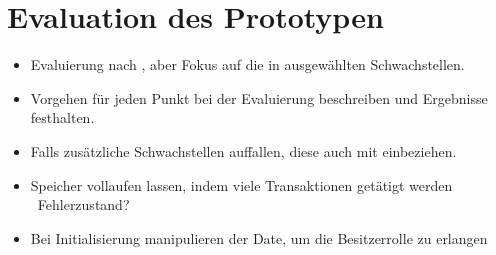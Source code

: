 \section{Evaluation des Prototypen}
\label{sec:evaluation}

    \begin{itemize}[noitemsep]
        \item Evaluierung nach \cite{Miessler}, aber Fokus auf die in  ausgewählten Schwachstellen. 
        \item Vorgehen für jeden Punkt bei der Evaluierung beschreiben und Ergebnisse festhalten. 
        \item Falls zusätzliche Schwachstellen auffallen, diese auch mit einbeziehen.
    \end{itemize}
    
    \begin{itemize}[noitemsep]
        \item Speicher vollaufen lassen, indem viele Transaktionen getätigt werden \textrightarrow\ Fehlerzustand?
        \item Bei Initialisierung manipulieren der Date, um die Besitzerrolle zu erlangen
    \end{itemize}